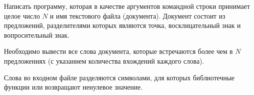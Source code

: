 
Написать программу, которая в качестве аргументов командной строки
принимает целое число $N$ и имя текстового файла (документа). Документ
состоит из предложений, разделителями которых являются точка,
восклицательный знак и вопросительный знак.

Необходимо вывести все
слова документа, которые встречаются более чем в $N$ предложениях (с
указанием количества вхождений каждого слова).

Слова во входном файле разделяются символами, для которых
библиотечные функции  или  возвращают ненулевое
значение.
